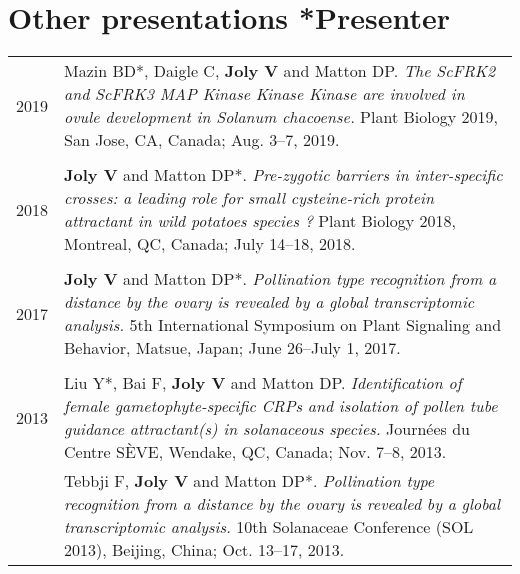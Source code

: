 \documentclass[letterpaper,12pt]{article}
\begin{document}
\vspace{6mm}

\section[Other presentations]{Other presentations \hfill \small{*Presenter}}

\begin{tabularx}{\textwidth}{@{}r|X@{}}

2019
& Mazin BD*, Daigle C, \textbf{Joly V} and Matton DP.
  \emph{The ScFRK2 and ScFRK3 MAP Kinase Kinase Kinase are involved in ovule
  development in \emph{Solanum chacoense}.}
  Plant Biology 2019, San Jose, CA, Canada;
  Aug. 3--7, 2019.
  \\

\multicolumn{2}{c}{} \\

2018
& \textbf{Joly V} and Matton DP*.
  \emph{Pre-zygotic barriers in inter-specific crosses: a leading role for small
  cysteine-rich protein attractant in wild potatoes species ?}
  Plant Biology 2018, Montreal, QC, Canada;
  July 14–18, 2018.
  \\

\multicolumn{2}{c}{} \\

2017
& \textbf{Joly V} and Matton DP*.
  \emph{Pollination type recognition from a distance by the ovary is revealed
  by a global transcriptomic analysis.}
  5th International Symposium on Plant Signaling and Behavior, Matsue, Japan;
  June 26–July 1, 2017.
  \\

\multicolumn{2}{c}{} \\

2013
& Liu Y*, Bai F, \textbf{Joly V} and Matton DP.
  \emph{Identification of female gametophyte-specific CRPs and isolation of
  pollen tube guidance attractant(s) in solanaceous species.}
  Journées du Centre SÈVE, Wendake, QC, Canada;
  Nov. 7–8, 2013.
  \vspace{1.5mm}
  \\

& Tebbji F, \textbf{Joly V} and Matton DP*. \emph{Pollination type recognition
  from a distance by the ovary is revealed by a global transcriptomic analysis.}
  10th Solanaceae Conference (SOL 2013), Beijing, China;
  Oct. 13–17, 2013.
  \vspace{1.5mm}
  \\


\end{tabularx}
\end{document}
